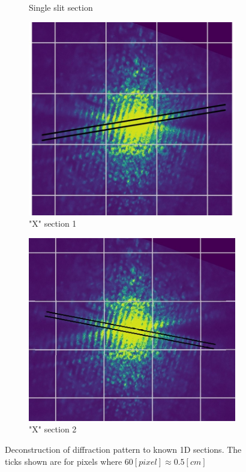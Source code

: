 \begin{figure}[H]
\begin{subfigure}{0.48\columnwidth}
        \caption{Single slit section}
        \label{fig:HelixSection2}
    \end{subfigure}
    \begin{subfigure}{0.46\columnwidth}
        \centering
        \includegraphics[width=\columnwidth]{figures/HelixSection4.jpg} %
        \caption{"X" section 1}
        \label{fig:HelixSection3}
    \end{subfigure}
    \begin{subfigure}{0.48\columnwidth}
        \centering
        \includegraphics[width=\columnwidth]{figures/HelixSection3.jpg} %
        \caption{"X" section 2}
        \label{fig:HelixSection4}
    \end{subfigure}
    \caption{Deconstruction of diffraction pattern to known 1D sections. The ticks shown are for pixels where $60[pixel]\approx 0.5[cm]$}
    \label{fig:HelixSections}
\end{figure}